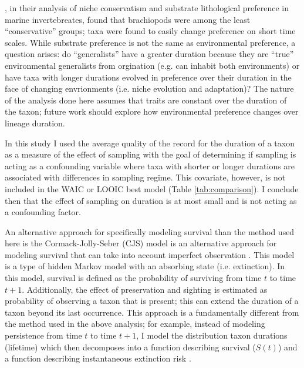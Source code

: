 \documentclass{article}
\begin{document}
\citet{Hopkins2014a}, in their analysis of niche conservatism and substrate lithological preference in marine invertebreates, found that brachiopods were among the least ``conservative'' groups; taxa were found to easily change preference on short time scales. While substrate preference is not the same as environmental preference, a question arises: do ``generalists'' have a greater duration because they are ``true'' environmental generalists from orgination (e.g. can inhabit both environments) or have taxa with longer durations evolved in preference over their duration in the face of changing envrionments (i.e. niche evolution and adaptation)? The nature of the analysis done here assumes that traits are constant over the duration of the taxon; future work should explore how environmental preference changes over lineage duration.


In this study I used the average quality of the record for the duration of a taxon as a measure of the effect of sampling with the goal of determining if sampling is acting as a confounding variable where taxa with shorter or longer durations are associated with differences in sampling regime. This covariate, however, is not included in the WAIC or LOOIC best model (Table \ref{tab:comparison}). I conclude then that the effect of sampling on duration is at most small and is not acting as a confounding factor.

An alternative approach for specifically modeling survival than the method used here is the Cormack-Jolly-Seber (CJS) model is an alternative approach for modeling survival that can take into account imperfect observation \citep{Royle2008,Liow2008,Tomiya2013,Liow2010b}. This model is a type of hidden Markov model with an absorbing state (i.e. extinction). In this model, survival is defined as the probability of surviving from time \(t\) to time \(t + 1\). Additionally, the effect of preservation and sighting is estimated as probability of observing a taxon that is present; this can extend the duration of a taxon beyond its last occurrence. This approach is a fundamentally different from the method used in the above analysis; for example, instead of modeling persistence from time \(t\) to time \(t + 1\), I model the distribution taxon durations (lifetime) which then decomposes into a function describing survival (\(S(t)\)) and a function describing instantaneous extinction risk \citep{Klein2003,Royle2008}. 
\end{document}

